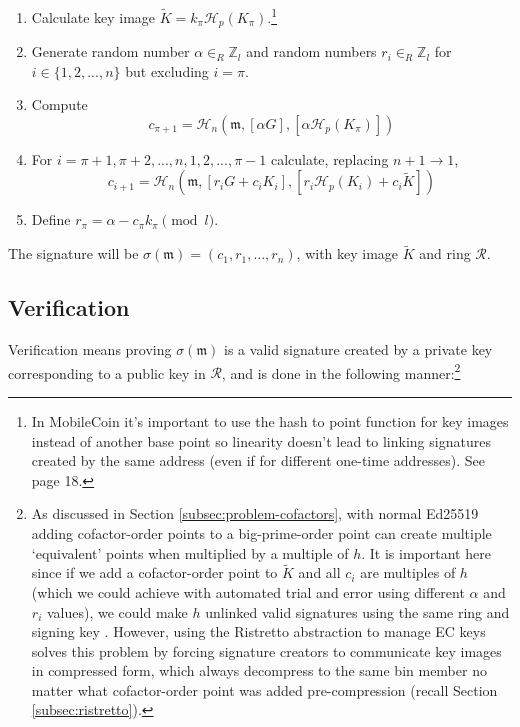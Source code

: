 \begin{enumerate}
	\item Calculate key image \(\tilde{K} = k_\pi \mathcal{H}_p(K_\pi)\).\footnote{In MobileCoin it's important to use the hash to point function for key images instead of another base point so linearity doesn't lead to linking signatures created by the same address (even if for different one-time addresses). See \cite{cryptoNoteWhitePaper} page 18.}

	\item Generate random number \(\alpha \in_R \mathbb{Z}_l\) and random numbers \(r_i \in_R \mathbb{Z}_l\) for \(i \in \{1, 2, ..., n\}\) but excluding \(i = \pi\).

	\item Compute
	\[c_{\pi+1} = \mathcal{H}_n(\mathfrak{m}, [\alpha G], [\alpha \mathcal{H}_p(K_\pi)])\]

	\item For \(i = \pi+1, \pi+2, ..., n, 1, 2, ..., \pi-1\) calculate, replacing \(n + 1 \rightarrow 1\),\vspace{.175cm}
	\[c_{i+1} = \mathcal{H}_n(\mathfrak{m}, [r_i G + c_i K_i], [r_i \mathcal{H}_p(K_i) + c_i \tilde{K}])\]

	\item Define \(r_\pi = \alpha - c_\pi k_\pi \pmod l\).
\end{enumerate}

The signature will be \(\sigma(\mathfrak{m}) = (c_1, r_1, ..., r_n)\), with key image $\tilde{K}$ and ring $\mathcal{R}$.


\subsection*{Verification}

Verification means proving $\sigma(\mathfrak{m})$ is a valid signature created by a private key corresponding to a public key in $\mathcal{R}$, and is done in the following manner:\footnote{As discussed in Section \ref{subsec:problem-cofactors}, with normal Ed25519 adding cofactor-order points to a big-prime-order point can create multiple `equivalent' points when multiplied by a multiple of $h$. It is important here since if we add a cofactor-order point to $\tilde{K}$ and all $c_i$ are multiples of $h$ (which we could achieve with automated trial and error using different $\alpha$ and $r_i$ values), we could make $h$ unlinked valid signatures using the same ring and signing key \cite{key-image-bug}. However, using the Ristretto abstraction to manage EC keys solves this problem by forcing signature creators to communicate key images in compressed form, which always decompress to the same bin member no matter what cofactor-order point was added pre-compression (recall Section \ref{subsec:ristretto}).}

